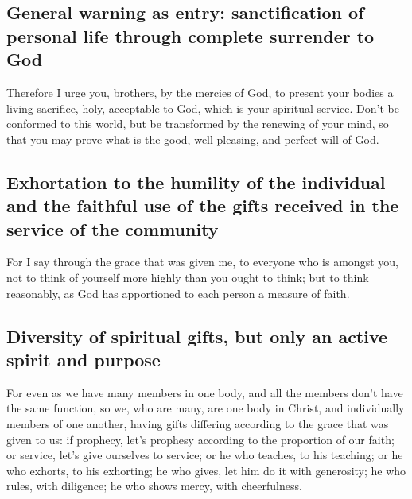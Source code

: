 \hypertarget{general-warning-as-entry-sanctification-of-personal-life-through-complete-surrender-to-god}{%
\subsection{General warning as entry: sanctification of personal life
through complete surrender to
God}\label{general-warning-as-entry-sanctification-of-personal-life-through-complete-surrender-to-god}}

 Therefore I urge you, brothers, by the mercies of God, to
present your bodies a living sacrifice, holy, acceptable to God, which
is your spiritual service.  Don't be conformed to this
world, but be transformed by the renewing of your mind, so that you may
prove what is the good, well-pleasing, and perfect will of God.

\hypertarget{exhortation-to-the-humility-of-the-individual-and-the-faithful-use-of-the-gifts-received-in-the-service-of-the-community}{%
\subsection{Exhortation to the humility of the individual and the
faithful use of the gifts received in the service of the
community}\label{exhortation-to-the-humility-of-the-individual-and-the-faithful-use-of-the-gifts-received-in-the-service-of-the-community}}

 For I say through the grace that was given me, to
everyone who is amongst you, not to think of yourself more highly than
you ought to think; but to think reasonably, as God has apportioned to
each person a measure of faith.

\hypertarget{diversity-of-spiritual-gifts-but-only-an-active-spirit-and-purpose}{%
\subsection{Diversity of spiritual gifts, but only an active spirit and
purpose}\label{diversity-of-spiritual-gifts-but-only-an-active-spirit-and-purpose}}

 For even as we have many members in one body, and all the
members don't have the same function,  so we, who are
many, are one body in Christ, and individually members of one another,
 having gifts differing according to the grace that was
given to us: if prophecy, let's prophesy according to the proportion of
our faith;  or service, let's give ourselves to service;
or he who teaches, to his teaching;  or he who exhorts, to
his exhorting; he who gives, let him do it with generosity; he who
rules, with diligence; he who shows mercy, with cheerfulness.

